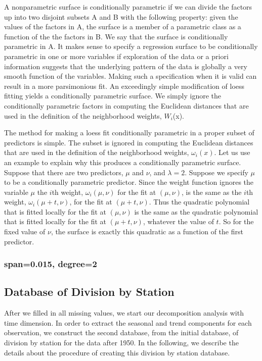 A nonparametric surface is conditionally
parametric if we can divide the factors up into two disjoint subsets
A and B with the following property: given the values of the factors in A,
the surface is a member of a parametric class as a function of the the factors
in B. We say that the surface is conditionally parametric in A.
It makes sense to specify a regression surface to be conditionally parametric
in one or more variables if exploration of the data or a priori information
suggests that the underlying pattern of the data is globally a very smooth
function of the variables. Making such a specification when it is valid can
result in a more parsimonious fit.
An exceedingly simple modification of loess fitting yields a conditionally
parametric surface. We simply ignore the conditionally parametric factors
in computing the Euclidean distances that are used in the definition of the
neighborhood weights, $W_i$(x).

The method for making a loess fit conditionally parametric in a proper subset of
predictors is simple. The subset is ignored in computing the Euclidean distances 
that are used in the definition of the neighborhood weights, $\omega_i(x)$. Let 
us use an example to explain why this produces a conditionally parametric surface. 
Suppose that there are two predictors, $\mu$ and $\nu$, and $\lambda=2$. Suppose 
we specify $\mu$ to be a conditionally parametric predictor. Since the weight 
function ignores the variable $\mu$ the $i$th weight, $\omega_i(\mu, \nu)$ for 
the fit at $(\mu, \nu)$, is the same as the $i$th weight, $\omega_i(\mu+t, \nu)$, 
for the fit at $(\mu+t, \nu)$. Thus the quadratic polynomial that is fitted locally 
for the fit at $(\mu, \nu)$ is the same as the quadratic polynomial that is fitted 
locally for the fit at $(\mu+t, \nu)$, whatever the value of $t$. So for the fixed 
value of $\nu$, the surface is exactly this quadratic as a function of the first 
predictor.

\subsubsection{span=0.015, degree=2}


\subsection{Database of Division by Station}
\label{sec:a1950.divibyStation}

After we filled in all missing values, we start our decomposition analysis with 
time dimension. In order to extract the seasonal and trend components for each 
observation, we construct the second database, from the initial database, of 
division by station for the data after 1950. In the following, we describe the 
details about the procedure of creating this division by station database.

